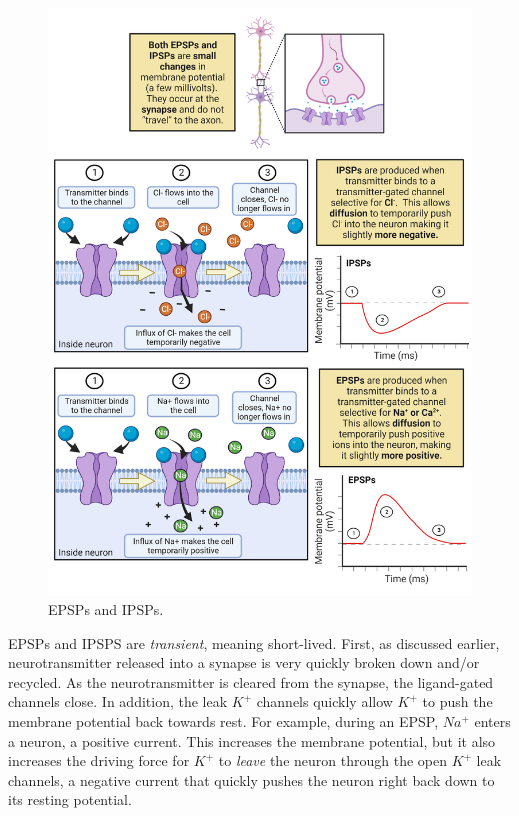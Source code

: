 \documentclass[
]{book}
\begin{document}
\begin{figure}

{\centering \includegraphics[width=0.9\linewidth]{images/ch02/02_22} 

}

\caption{EPSPs and IPSPs.}\label{fig:epsps-and-ipsps}
\end{figure}

EPSPs and IPSPS are \emph{transient}, meaning short-lived. First, as discussed earlier, neurotransmitter released into a synapse is very quickly broken down and/or recycled. As the neurotransmitter is cleared from the synapse, the ligand-gated channels close. In addition, the leak \(K^+\) channels quickly allow \(K^+\) to push the membrane potential back towards rest. For example, during an EPSP, \(Na^+\) enters a neuron, a positive current. This increases the membrane potential, but it also increases the driving force for \(K^+\) to \emph{leave} the neuron through the open \(K^+\) leak channels, a negative current that quickly pushes the neuron right back down to its resting potential.
\end{document}
